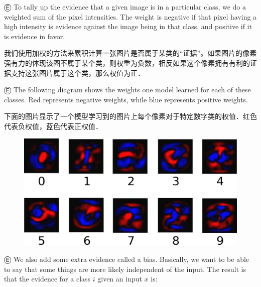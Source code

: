 Ⓔ To tally up the evidence that a given image is in a particular class, we do a weighted sum of the pixel intensities. The weight is negative if that pixel having a high intensity is evidence against the image being in that class, and positive if it is evidence in favor.

我们使用加权的方法来累积计算一张图片是否属于某类的“证据”。如果图片的像素强有力的体现该图不属于某个类，则权重为负数，相反如果这个像素拥有有利的证据支持这张图片属于这个类，那么权值为正．

Ⓔ The following diagram shows the weights one model learned for each of these classes. Red represents negative weights, while blue represents positive weights.

下面的图片显示了一个模型学习到的图片上每个像素对于特定数字类的权值．红色代表负权值，蓝色代表正权值．

\begin{figure}[htbp]
\centering
\includegraphics[width=.65\textwidth]{../SOURCE/images/softmax-weights.png}
\caption{}
\end{figure}

Ⓔ We also add some extra evidence called a bias. Basically, we want to be able to say that some things are more likely independent of the input. The result is that the evidence for a class $i$ given an input $x$ is:

